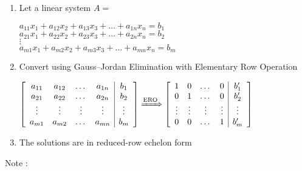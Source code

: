 \documentclass[a4paper,12pt]{article}
\begin{document}
\begin{enumerate}
  \item Let a linear system \(A=\)
        \begin{center}
          \(a_{11}x_1+a_{12}x_2+a_{13}x_3+\dots+a_{1n}x_n=b_1\) \\
          \(a_{21}x_1+a_{22}x_2+a_{23}x_3+\dots+a_{2n}x_n=b_2\) \\
          \(\vdots\) \\
          \(a_{m1}x_1+a_{m2}x_2+a_{m3}x_3+\dots+a_{mn}x_n=b_m\)
        \end{center}
  \item Convert using Gauss–Jordan Elimination with Elementary Row Operation
        \begin{center}
          \(\left[\begin{array}{cccc|c}
              a_{11} & a_{12} & \dots  & a_{1n} & b_1    \\
              a_{21} & a_{22} & \dots  & a_{2n} & b_2    \\
              \vdots & \vdots & \vdots & \vdots & \vdots \\
              a_{m1} & a_{m2} & \dots  & a_{mn} & b_m    \\
            \end{array}\right] \xRightarrow{\text{ERO}} \left[\begin{array}{cccc|c}
              1      & 0      & \dots  & 0      & b_1'   \\
              0      & 1      & \dots  & 0      & b_2'   \\
              \vdots & \vdots & \vdots & \vdots & \vdots \\
              0      & 0      & \dots  & 1      & b_m'   \\
            \end{array}\right] \)
        \end{center}
  \item The solutions are in reduced-row echelon form
\end{enumerate}
Note :
\end{document}
